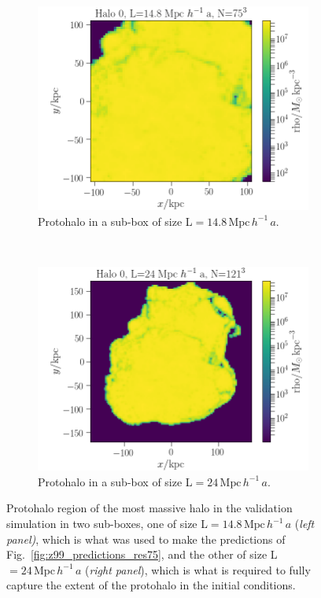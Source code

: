 \documentclass[11pt]{article}
\begin{document}
\begin{figure}
    \centering
    \begin{subfigure}{0.5\textwidth}
        \centering
        \includegraphics[width=\textwidth]{z99/halo0_75^3.png}
        \caption{Protohalo in a sub-box of size L$=14.8 \, \mathrm{Mpc} \, h^{-1} \, a$.}
    \end{subfigure}%
    ~ 
    \begin{subfigure}{0.5\textwidth}
        \centering
        \includegraphics[width=\textwidth]{z99/halo0_121^3.png}
        \caption{Protohalo in a sub-box of size L$=24 \, \mathrm{Mpc} \, h^{-1} \, a$.}
    \end{subfigure}
    \caption{Protohalo region of the most massive halo in the validation simulation in two sub-boxes, one of size L$=14.8 \, \mathrm{Mpc} \, h^{-1} \, a$ (\textit{left panel)}, which is what was used to make the predictions of Fig.~\ref{fig:z99_predictions_res75}, and the other of size L$=24 \, \mathrm{Mpc} \, h^{-1} \, a$ (\textit{right panel}), which is what is required to fully capture the extent of the protohalo in the initial conditions.}
    \label{fig:protohalo_75}
\end{figure}
\end{document}
